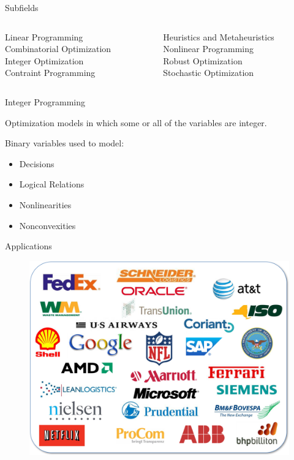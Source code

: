 \documentclass[10pt,utf8,presentation]{beamer}
\begin{document}
\begin{frame}{Subfields}
 
\begin{columns}[t]

 \begin{column}{0.5\textwidth}
  Linear Programming \\
  Combinatorial Optimization \\
  \alert{Integer Optimization} \\
  Contraint Programming
 \end{column}
 
  \begin{column}{0.5\textwidth}
  Heuristics and Metaheuristics \\
  Nonlinear Programming \\
  Robust Optimization \\
  Stochastic Optimization
 \end{column}

 
\end{columns}

\end{frame}


\begin{frame}{Integer Programming}

  Optimization models in which some or all of the variables are integer.
  
  Binary variables used to model:
  
  \begin{itemize}
   \item Decisions
   \item Logical Relations
   \item Nonlinearities
   \item Nonconvexities
  \end{itemize}


\end{frame}

\begin{frame}{Applications}
 
  \begin{figure}
    \includegraphics[scale=0.35]{fig/customer-logos4.png}
  \end{figure}
 
\end{frame}
\end{document}

